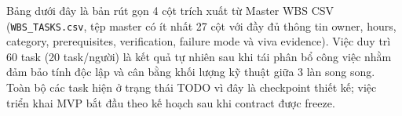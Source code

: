 
Bảng dưới đây là bản rút gọn 4 cột trích xuất từ Master WBS CSV (\texttt{WBS\_TASKS.csv}, tệp master có ít nhất 27 cột với đầy đủ thông tin owner, hours, category, prerequisites, verification, failure mode và viva evidence). Việc duy trì 60 task (20 task/người) là kết quả tự nhiên sau khi tái phân bổ công việc nhằm đảm bảo tính độc lập và cân bằng khối lượng kỹ thuật giữa 3 làn song song. Toàn bộ các task hiện ở trạng thái TODO vì đây là checkpoint thiết kế; việc triển khai MVP bắt đầu theo kế hoạch sau khi contract được freeze.

\begingroup
\scriptsize
\renewcommand{\arraystretch}{0.82}
\setlength{\tabcolsep}{3pt}
